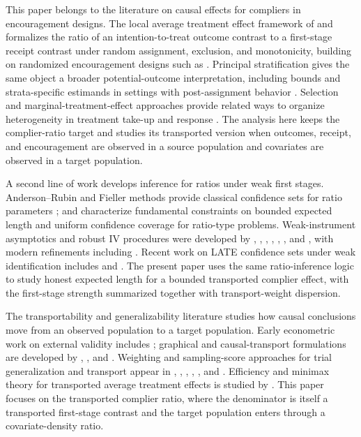 \documentclass[11pt]{article}
\begin{document}
This paper belongs to the literature on causal effects for compliers in encouragement designs. The local average treatment effect framework of \citet{ImbensAngrist1994} and \citet{AngristImbensRubin1996} formalizes the ratio of an intention-to-treat outcome contrast to a first-stage receipt contrast under random assignment, exclusion, and monotonicity, building on randomized encouragement designs such as \citet{Bloom1984}. Principal stratification gives the same object a broader potential-outcome interpretation, including bounds and strata-specific estimands in settings with post-assignment behavior \citep{BalkePearl1997,ImbensRubin1997,FrangakisRubin2002}. Selection and marginal-treatment-effect approaches provide related ways to organize heterogeneity in treatment take-up and response \citep{HeckmanVytlacil2005}. The analysis here keeps the complier-ratio target and studies its transported version when outcomes, receipt, and encouragement are observed in a source population and covariates are observed in a target population.

A second line of work develops inference for ratios under weak first stages. Anderson--Rubin and Fieller methods provide classical confidence sets for ratio parameters \citep{AndersonRubin1949,Fieller1954}; \citet{GleserHwang1987} and \citet{Dufour1997} characterize fundamental constraints on bounded expected length and uniform confidence coverage for ratio-type problems. Weak-instrument asymptotics and robust IV procedures were developed by \citet{BoundJaegerBaker1995}, \citet{StaigerStock1997}, \citet{StockWrightYogo2002}, \citet{Moreira2003}, \citet{AndrewsMoreiraStock2006}, \citet{Mikusheva2010}, and \citet{AndrewsStockSun2019}, with modern refinements including \citet{BertanhaMoreira2020}. Recent work on LATE confidence sets under weak identification includes \citet{Ma2023} and \citet{SmuclerLanniMasip2025}. The present paper uses the same ratio-inference logic to study honest expected length for a bounded transported complier effect, with the first-stage strength summarized together with transport-weight dispersion.

The transportability and generalizability literature studies how causal conclusions move from an observed population to a target population. Early econometric work on external validity includes \citet{HotzImbensMortimer2005}; graphical and causal-transport formulations are developed by \citet{PearlBareinboim2011}, \citet{BareinboimPearl2013}, and \citet{BareinboimPearl2016}. Weighting and sampling-score approaches for trial generalization and transport appear in \citet{ColeStuart2010}, \citet{StuartColeBradshawLeaf2011}, \citet{Tipton2013}, \citet{Dahabreh2020}, \citet{DahabrehPetitoRobertson2020}, and \citet{Nguyen2017}. Efficiency and minimax theory for transported average treatment effects is studied by \citet{ZengKennedyBodnarNaimi2024}. This paper focuses on the transported complier ratio, where the denominator is itself a transported first-stage contrast and the target population enters through a covariate-density ratio.
\end{document}
